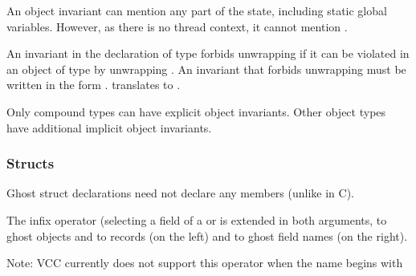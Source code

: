 \documentclass[preprint,nocopyrightspace]{sigplanconf}
\begin{document}
{{{An object invariant can mention any part of the state, including
static global variables. However, as there is no thread context, it
cannot mention \vcc{\me}.

An invariant in the declaration of type  forbids unwrapping if
it can be violated in an object  of type  by
unwrapping . An invariant that forbids unwrapping must be
written in the form . 
 translates to 
.

Only compound types can have explicit object invariants. Other object
types have additional implicit object invariants.

\subsubsection{Structs}
Ghost struct declarations need not declare any members (unlike in C).

The infix  operator (selecting a field of a 
or  is extended in both arguments, to ghost objects and to
records (on the left) and to ghost field names (on the right).

Note: VCC currently does not support this operator when the name begins
with }}}
\end{document}
